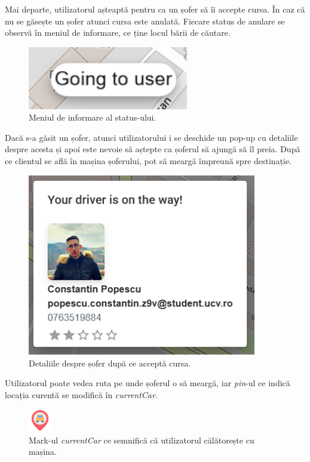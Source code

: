 Mai departe, utilizatorul așteaptă pentru ca un șofer să îi accepte cursa. În caz că nu se găsește un șofer atunci cursa este anulată.
Fiecare status de anulare se observă în meniul de informare, ce ține locul bării de căutare.

\begin{figure}[H]
    \centering
    \includegraphics[width=7cm]{Assets/status.png}
    \caption{Meniul de informare al status-ului.}
    \label{fig:statusMenu}
\end{figure}

Dacă s-a găsit un șofer, atunci utilizatorului i se deschide un pop-up cu detaliile
despre acesta și apoi este nevoie să aștepte ca șoferul să ajungă să îl preia. După ce clientul se află în mașina șoferului, pot să meargă împreună spre 
destinație.

\begin{figure}[H]
    \centering
    \includegraphics[width=10cm]{Assets/driverDetails.png}
    \caption{Detaliile despre șofer după ce acceptă cursa.}
    \label{fig:driverDetails}
\end{figure}

Utilizatorul poate vedea ruta pe unde șoferul o să meargă, iar \textit{pin}-ul ce indică
locația curentă se modifică în \textit{currentCar}.

\begin{figure}[H]
    \centering
    \includegraphics[width=1cm]{Assets/currentCar.png}
    \caption{Mark-ul \textit{currentCar} ce semnifică că utilizatorul călătorește cu mașina.}
    \label{fig:currentCar}
\end{figure}

